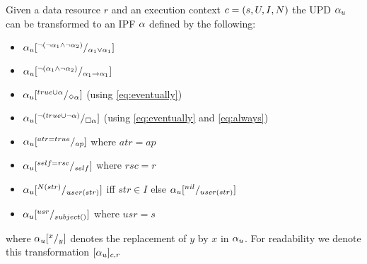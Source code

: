 \begin{definition}\label{def:pf-user-to-internal}
Given a data resource $r$ and an execution context $c = \left( s, U, I, N \right)$ the UPD $\alpha_u$ can be transformed to an IPF $\alpha$ defined by the following:
\begin{itemize}
    \item $\alpha_u[^{\lnot(\lnot \alpha_1 \land \lnot \alpha_2)} /_{\alpha_1 \lor \alpha_1}]$
    \item $\alpha_u[^{\lnot(\alpha_1 \land \lnot \alpha_2)} /_{\alpha_1 \rightarrow \alpha_1}]$ 
    \item $\alpha_u[^{true \cup \alpha} /_{\Diamond \alpha}]$ \hfill(using \autoref{eq:eventually})
    \item $\alpha_u[^{\lnot (true \cup \lnot \alpha)} /_{\square \alpha}]$ \hfill(using \autoref{eq:eventually} and \autoref{eq:always})
    \item $\alpha_u[^{atr = true} /_{ap}]$ where $atr = ap$
    \item $\alpha_u[^{self = rsc} /_{self}]$ where $rsc = r$
    \item $\alpha_u[^{N(str)} /_{user(str)}]$ iff $str \in I$ else $\alpha_u[^{nil} /_{user(str)}]$
    \item $\alpha_u[^{usr} /_{subject()}]$ where $usr = s$
\end{itemize}
where $\alpha_u[^x / _y]$ denotes the replacement of $y$ by $x$ in $\alpha_u$. For readability we denote this transformation $[\alpha_u]_{c,r}$
\end{definition}

